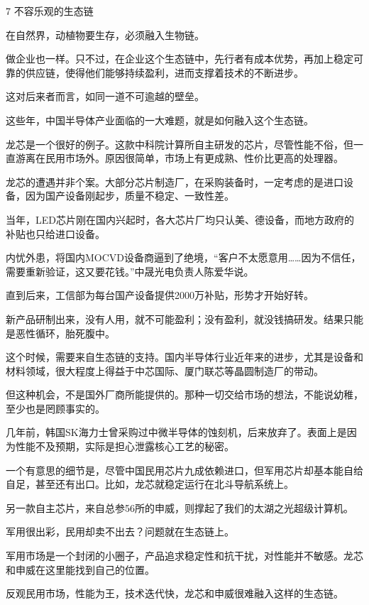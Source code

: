 \documentclass[utf8]{book}
\begin{document}
	
	
	\begin{flushleft}
		{\Large 7 不容乐观的生态链}
	\end{flushleft}
	
	
	在自然界，动植物要生存，必须融入生物链。
	
	做企业也一样。只不过，在企业这个生态链中，先行者有成本优势，再加上稳定可靠的供应链，使得他们能够持续盈利，进而支撑着技术的不断进步。
	
	这对后来者而言，如同一道不可逾越的壁垒。
	
	这些年，中国半导体产业面临的一大难题，就是如何融入这个生态链。
	
	龙芯是一个很好的例子。这款中科院计算所自主研发的芯片，尽管性能不俗，但一直游离在民用市场外。原因很简单，市场上有更成熟、性价比更高的处理器。
	
	龙芯的遭遇并非个案。大部分芯片制造厂，在采购装备时，一定考虑的是进口设备，因为国产设备刚起步，质量不稳定、一致性差。
	
	当年，LED芯片刚在国内兴起时，各大芯片厂均只认美、德设备，而地方政府的补贴也只给进口设备。
	
	内忧外患，将国内MOCVD设备商逼到了绝境，“客户不太愿意用……因为不信任，需要重新验证，这又要花钱。”中晟光电负责人陈爱华说。
	
	直到后来，工信部为每台国产设备提供2000万补贴，形势才开始好转。
	
	新产品研制出来，没有人用，就不可能盈利；没有盈利，就没钱搞研发。结果只能是恶性循环，胎死腹中。
	
	这个时候，需要来自生态链的支持。国内半导体行业近年来的进步，尤其是设备和材料领域，很大程度上得益于中芯国际、厦门联芯等晶圆制造厂的带动。
	
	但这种机会，不是国外厂商所能提供的。那种一切交给市场的想法，不能说幼稚，至少也是罔顾事实的。
	
	几年前，韩国SK海力士曾采购过中微半导体的蚀刻机，后来放弃了。表面上是因为性能不及预期，实际是担心泄露核心工艺的秘密。
	
	一个有意思的细节是，尽管中国民用芯片九成依赖进口，但军用芯片却基本能自给自足，甚至还有出口。比如，龙芯就稳定运行在北斗导航系统上。
	
	另一款自主芯片，来自总参56所的申威，则撑起了我们的太湖之光超级计算机。
	
	军用很出彩，民用却卖不出去？问题就在生态链上。
	
	军用市场是一个封闭的小圈子，产品追求稳定性和抗干扰，对性能并不敏感。龙芯和申威在这里能找到自己的位置。
	
	反观民用市场，性能为王，技术迭代快，龙芯和申威很难融入这样的生态链。
	
\end{document}
